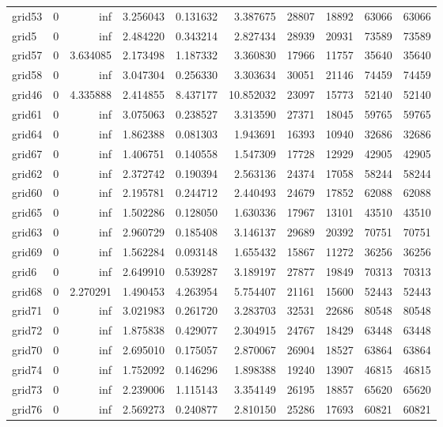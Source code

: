 \begin{longtable}{|l|r|r|r|r|r|r|r|r|r|}
grid53 & 0 & inf & 3.256043 & 0.131632 & 3.387675 & 28807 & 18892 & 63066 & 63066 \\
grid5 & 0 & inf & 2.484220 & 0.343214 & 2.827434 & 28939 & 20931 & 73589 & 73589 \\
grid57 & 0 & 3.634085 & 2.173498 & 1.187332 & 3.360830 & 17966 & 11757 & 35640 & 35640 \\
grid58 & 0 & inf & 3.047304 & 0.256330 & 3.303634 & 30051 & 21146 & 74459 & 74459 \\
grid46 & 0 & 4.335888 & 2.414855 & 8.437177 & 10.852032 & 23097 & 15773 & 52140 & 52140 \\
grid61 & 0 & inf & 3.075063 & 0.238527 & 3.313590 & 27371 & 18045 & 59765 & 59765 \\
grid64 & 0 & inf & 1.862388 & 0.081303 & 1.943691 & 16393 & 10940 & 32686 & 32686 \\
grid67 & 0 & inf & 1.406751 & 0.140558 & 1.547309 & 17728 & 12929 & 42905 & 42905 \\
grid62 & 0 & inf & 2.372742 & 0.190394 & 2.563136 & 24374 & 17058 & 58244 & 58244 \\
grid60 & 0 & inf & 2.195781 & 0.244712 & 2.440493 & 24679 & 17852 & 62088 & 62088 \\
grid65 & 0 & inf & 1.502286 & 0.128050 & 1.630336 & 17967 & 13101 & 43510 & 43510 \\
grid63 & 0 & inf & 2.960729 & 0.185408 & 3.146137 & 29689 & 20392 & 70751 & 70751 \\
grid69 & 0 & inf & 1.562284 & 0.093148 & 1.655432 & 15867 & 11272 & 36256 & 36256 \\
grid6 & 0 & inf & 2.649910 & 0.539287 & 3.189197 & 27877 & 19849 & 70313 & 70313 \\
grid68 & 0 & 2.270291 & 1.490453 & 4.263954 & 5.754407 & 21161 & 15600 & 52443 & 52443 \\
grid71 & 0 & inf & 3.021983 & 0.261720 & 3.283703 & 32531 & 22686 & 80548 & 80548 \\
grid72 & 0 & inf & 1.875838 & 0.429077 & 2.304915 & 24767 & 18429 & 63448 & 63448 \\
grid70 & 0 & inf & 2.695010 & 0.175057 & 2.870067 & 26904 & 18527 & 63864 & 63864 \\
grid74 & 0 & inf & 1.752092 & 0.146296 & 1.898388 & 19240 & 13907 & 46815 & 46815 \\
grid73 & 0 & inf & 2.239006 & 1.115143 & 3.354149 & 26195 & 18857 & 65620 & 65620 \\
grid76 & 0 & inf & 2.569273 & 0.240877 & 2.810150 & 25286 & 17693 & 60821 & 60821 \\

\end{longtable}
